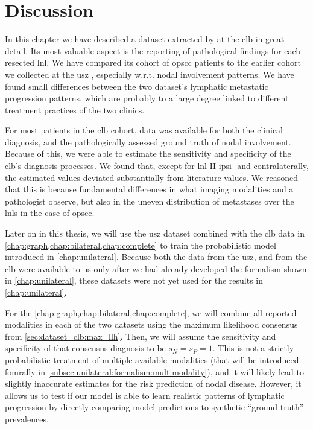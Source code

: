 \documentclass[\relativeRoot/main.tex]{subfiles}
\begin{document}
\section{Discussion}
\label{sec:dataset_clb:discussion}

In this chapter we have described a dataset extracted by  at the \gls{clb} in great detail. Its most valuable aspect is the reporting of pathological findings for each resected \gls{lnl}. We have compared its cohort of \gls{opscc} patients to the earlier cohort we collected at the \gls{usz} \cite{ludwig_detailed_2021}, especially w.r.t. nodal involvement patterns. We have found small differences between the two dataset's lymphatic metastatic progression patterns, which are probably to a large degree linked to different treatment practices of the two clinics.

For most patients in the \gls{clb} cohort, data was available for both the clinical diagnosis, and the pathologically assessed ground truth of nodal involvement. Because of this, we were able to estimate the sensitivity and specificity of the \gls{clb}'s diagnosis processes. We found that, except for \gls{lnl} II ipsi- and contralaterally, the estimated values deviated substantially from literature values. We reasoned that this is because fundamental differences in what imaging modalities and a pathologist observe, but also in the uneven distribution of metastases over the \glspl{lnl} in the case of \gls{opscc}.

Later on in this thesis, we will use the \gls{usz} dataset combined with the \gls{clb} data in \cref{chap:graph,chap:bilateral,chap:complete} to train the probabilistic model introduced in \cref{chap:unilateral}. Because both the data from the \gls{usz}, and from the \gls{clb} were available to us only after we had already developed the formalism shown in \cref{chap:unilateral}, these datasets were not yet used for the results in \cref{chap:unilateral}.

For the \cref{chap:graph,chap:bilateral,chap:complete}, we will combine all reported modalities in each of the two datasets using the maximum likelihood consensus from \cref{sec:dataset_clb:max_llh}. Then, we will assume the sensitivity and specificity of that consensus diagnosis to be $s_N = s_P = 1$. This is not a strictly probabilistic treatment of multiple available modalities (that will be introduced fomrally in \cref{subsec:unilateral:formalism:multimodality}), and it will likely lead to slightly inaccurate estimates for the risk prediction of nodal disease. However, it allows us to test if our model is able to learn realistic patterns of lymphatic progression by directly comparing model predictions to synthetic ``ground truth'' prevalences.
\end{document}
